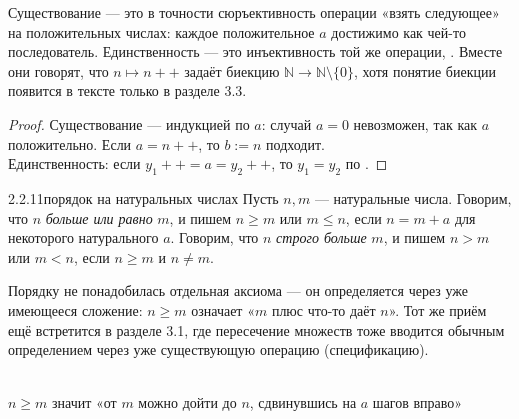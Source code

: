 \begin{intuition}
Существование — это в точности сюръективность операции «взять следующее» на положительных
числах: каждое положительное $a$ достижимо как чей-то последователь. Единственность — это
инъективность той же операции, . Вместе они говорят, что
$n \mapsto n{+}{+}$ задаёт биекцию $\mathbb{N} \to \mathbb{N}\setminus\{0\}$, хотя понятие
биекции появится в тексте только в разделе 3.3.
\end{intuition}

\begin{proof}
Существование — индукцией по $a$: случай $a=0$ невозможен, так как $a$ положительно. Если
$a=n{+}{+}$, то $b:=n$ подходит.\\
Единственность: если $y_1{+}{+}=a=y_2{+}{+}$, то $y_1=y_2$ по .
\end{proof}

\begin{definition}{2.2.11}{порядок на натуральных числах}
Пусть $n,m$ — натуральные числа. Говорим, что $n$ \emph{больше или равно} $m$, и пишем
$n \geq m$ или $m \leq n$, если $n=m+a$ для некоторого натурального $a$. Говорим, что $n$
\emph{строго больше} $m$, и пишем $n>m$ или $m<n$, если $n \geq m$ и $n \neq m$.
\end{definition}

\begin{intuition}
Порядку не понадобилась отдельная аксиома — он определяется через уже имеющееся сложение:
$n \geq m$ означает «$m$ плюс что-то даёт $n$». Тот же приём ещё встретится в разделе 3.1,
где пересечение множеств тоже вводится обычным определением через уже существующую операцию
(спецификацию).

\begin{center}
\\
{\footnotesize\color{intuitiongray}$n \geq m$ значит «от $m$ можно дойти до $n$, сдвинувшись
на $a$ шагов вправо»}
\end{center}
\end{intuition}


